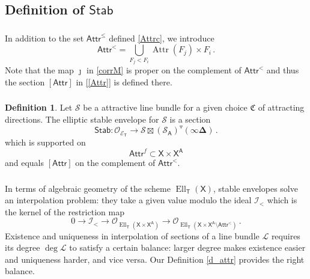 \documentclass[14pt]{extarticle}
\newcommand{\bT}{\mathsf{T}}
\newcommand{\bA}{\mathsf{A}}
\newcommand{\bX}{\mathsf{X}}
\newcommand{\cI}{\mathscr{I}}
\newcommand{\cL}{\mathscr{L}}
\newcommand{\cE}{\mathscr{E}}
\newcommand{\bDel}{\boldsymbol{\Delta}}
\newcommand{\fC}{\mathfrak{C}}
\newcommand{\cS}{\mathscr{S}}
\newcommand{\cO}{\mathscr{O}}
\newcommand{\fAttr}{\Attr^f}
\newcommand{\Attrc}{\Attr^{\le}}
\newcommand{\Attrl}{\Attr^{<}}
\newcommand{\Stab}{\mathsf{Stab}}
\newcommand{\Attr}{\mathsf{Attr}}
\newcommand{\dd}{\triangledown}
\DeclareMathOperator{\Ell}{Ell}
\DeclareMathOperator{\sAttr}{Attr}
\theoremstyle{definition}
\newtheorem{Definition}{Definition}
\begin{document}
\subsection{Definition of $\Stab$} 


\subsubsection{}

In addition to the set $\Attrc$ defined \eqref{Attrc}, we introduce
%
\begin{equation}
\Attrl= \bigcup_{F_j <  F_i} \sAttr(F_j) \times F_i \,.\label{Attrl}
\end{equation}
%
Note that the map $\jmath$ in \eqref{corrM} is proper on the
complement of $\Attrl$ and thus the section $[\Attr]$ in 
\eqref{[Attr]} is defined there. 

\subsubsection{}

\begin{Definition}
Let $\cS$ be a attractive line bundle for a given choice $\fC$ of
attracting directions. The elliptic stable envelope for $\cS$ is a
section
%
\begin{equation}
  \Stab : \cO_{\cE_\bT}  \to \cS \boxtimes \left(\cS_\bA\right)^\dd
  (\infty \bDel)
  \,. 
  \label{Stab}
  \end{equation} 
%
which is supported on
$$
\fAttr \subset \bX \times \bX^\bA
$$
and equals $[\Attr]$ on the complement of $\Attrl$. 
\end{Definition}

\subsubsection{}
In terms of algebraic geometry of the scheme $\Ell_\bT(\bX)$, stable
envelopes solve an interpolation problem: they take a given value
modulo the ideal $\cI_{<}$ which is the kernel of the restriction map
$$
0 \to \cI_{<}  \to \cO_{\Ell_{\bT}(\bX \times \bX^\bA)} \to
\cO_{\Ell_{\bT}(\bX \times \bX^\bA  \setminus \Attrl)} \,. 
$$
Existence and
uniqueness in interpolation of sections of a line bundle $\cL$ requires its degree
$\deg \cL$ to satisfy a certain balance: larger degree makes existence
easier and uniqueness harder, and vice versa. Our Definition
\ref{d_attr} provides the right balance. 

\subsubsection{}
\end{document}

